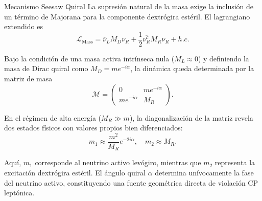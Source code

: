 \begin{block}{Mecanismo Seesaw Quiral}
  La supresión natural de la masa exige la inclusión de un término de Majorana
  para la componente dextrógira estéril. El lagrangiano extendido es
  \begin{equation}
    \mathcal{L}_{\text{Mass}} = \overline{\nu}_{L}M_{D}\nu_{R} 
    + \frac{1}{2}\overline{\nu_{R}^{c}}M_{R}\nu_{R} + h.c.
  \end{equation}

  Bajo la condición de una masa activa intrínseca nula ($M_L \approx 0$) y 
  definiendo la masa de Dirac quiral como $M_D = m e^{-i\alpha}$, la dinámica 
  queda determinada por la matriz de masa
  \begin{equation}
    \mathcal{M} = \begin{pmatrix} 
      0 & m e^{-i\alpha} \\ 
      m e^{-i\alpha} & M_R 
    \end{pmatrix}.
  \end{equation}

  En el régimen de alta energía ($M_R \gg m$), la diagonalización de la matriz 
  revela dos estados físicos con valores propios bien diferenciados:
  \begin{equation}
    m_1 \approx \frac{m^2}{M_R} e^{-2i\alpha}, \quad m_2 \approx M_R.
  \end{equation}

  Aquí, $m_1$ corresponde al neutrino activo levógiro, mientras que $m_2$ 
  representa la excitación dextrógira estéril. 
  El ángulo quiral $\alpha$ determina unívocamente la fase del neutrino activo, 
  constituyendo una fuente geométrica directa de violación CP leptónica.
\end{block}